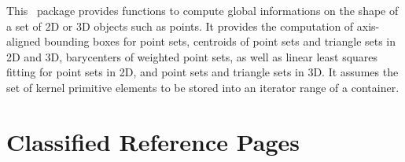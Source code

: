 
\label{ref_chapter_pca}




This \cgal\ package provides functions to compute global informations
on the shape of a set of 2D or 3D objects such as points. It provides the computation of axis-aligned bounding boxes for point sets, centroids of point sets and triangle sets in 2D and 3D, barycenters of weighted point sets, as well as linear least squares fitting for point sets in 2D, and point sets and triangle sets in 3D. It assumes the set of kernel primitive elements to be stored into an iterator range of a container.




\section{Classified Reference Pages}


\\
\\
\\
\\

